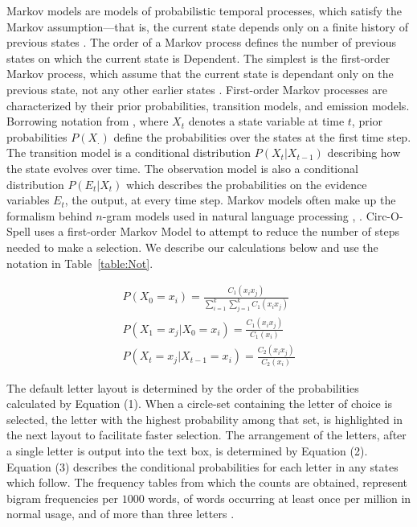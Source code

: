 \documentclass[12pt,titlepage]{article}
\begin{document}
Markov models are models of probabilistic temporal processes, which satisfy the Markov assumption---that
is, the current state depends only on a finite history of previous states \cite{russell_artificial_2002}.  The order of a Markov 
process defines the number of previous states on which the current state is Dependent.  The simplest is 
the first-order Markov process, which assume that the current state is dependant only on the previous 
state, not any other earlier states \cite{russell_artificial_2002}.  First-order Markov processes are characterized by their prior
probabilities, transition models, and emission models.  Borrowing notation from \cite{russell_artificial_2002}, where $X_t$  denotes
a state variable at time $t$, prior probabilities $P(X_.)$ define the probabilities over the states at the first 
time step.  The transition model is a conditional distribution $P(X_t | X_{t-1})$  describing how the state 
evolves over time.  The observation model is also a conditional distribution $P(E_t | X_t)$ which describes 
the probabilities on the evidence variables $E_t$, the output, at every time step.  Markov models often 
make up the formalism behind $n$-gram models used in natural language processing \cite{brown_class-based_1992}, \cite{makhoul_state_1995}. 
Circ-O-Spell uses a first-order Markov Model to attempt to reduce the number of steps needed to make 
a selection.  We describe our calculations below and use the notation in Table~\ref{table:Not}.

\begin{gather*}
P(X_0 = x_i) = \frac{\displaystyle C_1(x_i x_j)}{\displaystyle \sum_{i=1}^k \sum_{j=1}^k C_1(x_i x_j)} \tag{1} \\
P(X_1 = x_j | X_0 = x_i) = \frac{\displaystyle C_1(x_i x_j)}{\displaystyle C_1(x_i)} \tag{2} \\
P(X_t = x_j | X_{t-1} = x_i) = \frac{\displaystyle C_2(x_i x_j)}{\displaystyle C_2(x_i)} \tag{3}
\end{gather*}

The default letter layout is determined by the order of the probabilities calculated by Equation (1). 
When a circle-set containing the letter of choice is selected, the letter with the highest probability 
among that set, is highlighted in the next layout to facilitate faster selection.  The arrangement of the letters, after a single 
letter is output into the text box, is determined by Equation (2).  Equation (3) describes the conditional 
probabilities for each letter in any states which follow.  The frequency tables from which the counts are obtained, represent bigram frequencies per $1000$ 
words, of words occurring at least once per million in normal usage, and of more than three letters \cite{rawlinson_bigram_1976}.
\end{document}
